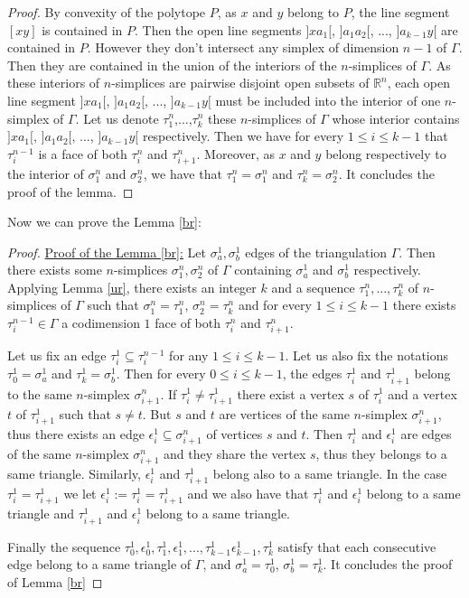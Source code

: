 \documentclass{article}
\begin{document}
\begin{proof}
    By convexity of the polytope $P$, as $x$ and $y$ belong to $P$, the line segment $[xy]$ is contained in $P$. Then the open line segments $]xa_1[$, $]a_1a_2[$, ..., $]a_{k-1}y[$ are contained in $P$. However they don't intersect any simplex of dimension $n-1$ of $\Gamma$. Then they are contained in the union of the interiors of the $n$-simplices of $\Gamma$. As these interiors of $n$-simplices are pairwise disjoint open subsets of $\mathbb{R}^n$, each open line segment $]xa_1[$, $]a_1a_2[$, ..., $]a_{k-1}y[$ must be included into the interior of one $n$-simplex of $\Gamma$. Let us denote $\tau_1^{n}$,...,$\tau^{n}_{k}$ these $n$-simplices of $\Gamma$ whose interior contains $]xa_1[$, $]a_1a_2[$, ..., $]a_{k-1}y[$ respectively. Then we have for every $1\leq i \leq k-1$ that $\tau^{n-1}_i$ is a face of both $\tau^n_i$ and $\tau^n_{i+1}$. Moreover, as $x$ and $y$ belong respectively to the interior of $\sigma^n_1$ and $\sigma^n_2$, we have that $\tau_1^n = \sigma_1^n$ and $\tau_k^n = \sigma_2^n$. It concludes the proof of the lemma.
\end{proof}

Now we can prove the Lemma \ref{br}:

\begin{proof}
    \underline{Proof of the Lemma \ref{br}:}
    Let $\sigma^1_a,\sigma^1_b$ edges of the triangulation $\Gamma$. Then there exists some $n$-simplices $\sigma^n_1,\sigma^n_2$ of $\Gamma$ containing $\sigma^1_a$ and $\sigma^1_b$ respectively. Applying Lemma \ref{ur}, there exists an integer $k$ and a sequence $\tau^n_1,...,\tau^n_k$ of $n$-simplices of $\Gamma$ such that $\sigma^n_1=\tau^n_1$, $\sigma^n_2 = \tau^n_k$ and for every $1 \leq i \leq k-1$ there exists $\tau^{n-1}_i \in \Gamma$ a codimension $1$ face of both $\tau^n_i$ and $\tau^n_{i+1}$.

    Let us fix an edge $\tau^1_i\subseteq\tau^{n-1}_i$ for any $1 \leq i \leq k-1$. Let us also fix the notations $\tau^1_{0}=\sigma^1_a$ and $\tau^1_{k} = \sigma^1_b$. Then for every $0\leq i \leq k-1$, the edges $\tau^1_i$ and $\tau^1_{i+1}$ belong to the same $n$-simplex $\sigma^n_{i+1}$. If $\tau^1_i\neq\tau^1_{i+1}$ there exist a vertex $s$ of $\tau^1_i$ and a vertex $t$ of $\tau^1_{i+1}$ such that $s \neq t$. But $s$ and $t$ are vertices of the same $n$-simplex $\sigma^n_{i+1}$, thus there exists an edge $\epsilon_i^1\subseteq\sigma^n_{i+1}$ of vertices $s$ and $t$. Then $\tau^1_i$ and $\epsilon^1_i$ are edges of the same $n$-simplex $\sigma^n_{i+1}$ and they share the vertex $s$, thus they belongs to a same triangle. Similarly, $\epsilon^1_i$ and $\tau^1_{i+1}$ belong also to a same triangle. In the case $\tau^1_i=\tau^1_{i+1}$ we let $\epsilon^1_i:=\tau^1_i=\tau^1_{i+1}$ and we also have that $\tau^1_i$ and $\epsilon^1_i$ belong to a same triangle and $\tau^1_{i+1}$ and $\epsilon^1_i$ belong to a same triangle.

    Finally the sequence $\tau^1_{0},\epsilon^1_0,\tau^1_1,\epsilon^1_1,...,\tau^1_{k-1}\epsilon^1_{k-1},\tau^1_k$ satisfy that each consecutive edge belong to a same triangle of $\Gamma$, and $\sigma^1_a=\tau^1_0$, $ \sigma^1_b = \tau^1_k$. It concludes the proof of Lemma \ref{br}
\end{proof}
\end{document}
